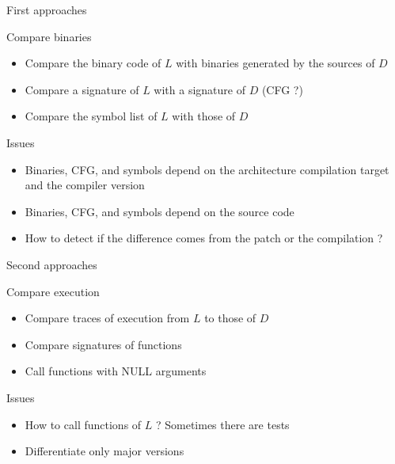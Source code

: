\documentclass[11pt]{beamer}
\begin{document}
\begin{frame}{First approaches}

\begin{block}{Compare binaries}
	\begin{itemize}
		\item Compare the binary code of $L$ with binaries generated by the sources of $D$
		\item Compare a signature of $L$ with a signature of $D$ (CFG ?)
		\item Compare the symbol list of $L$ with those of $D$
	\end{itemize}
\end{block}

\begin{block}{Issues}
	\begin{itemize}
		\item Binaries, CFG, and symbols depend on the architecture compilation target and the compiler version
		\item Binaries, CFG, and symbols depend on the source code
		\item How to detect if the difference comes from the patch or the compilation ?
	\end{itemize}
\end{block}

\end{frame}



\begin{frame}{Second approaches}

\begin{block}{Compare execution}
	\begin{itemize}
		\item Compare traces of execution from $L$ to those of $D$ 
		\item Compare signatures of functions
		\item Call functions with NULL arguments
	\end{itemize}
\end{block}

\begin{block}{Issues}
	\begin{itemize}
		\item How to call functions of $L$ ? Sometimes there are tests
		\item Differentiate only major versions
		
	\end{itemize}
\end{block}


\end{frame}
\end{document}
